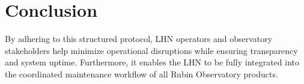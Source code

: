 \section*{Conclusion}

By adhering to this structured protocol, LHN operators and observatory stakeholders help minimize operational disruptions while ensuring transparency and system uptime. Furthermore, it enables the LHN to be fully integrated into the coordinated maintenance workflow of all Rubin Observatory products.
